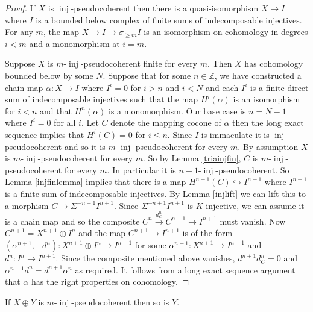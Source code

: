 \documentclass[12pt,oneside]{amsart}
\DeclareMathOperator{\inj}{inj}
\begin{document}
\begin{proof}
If $X$ is $\inj$-pseudocoherent then there is a quasi-isomorphism $X \to I$ where $I$ is a bounded below complex of finite sums of indecomposable injectives. For any $m$, the map $X \to I \to \sigma_{\geq m}I$ is an isomorphism on cohomology in degrees $i < m$ and a monomorphism at $i =m$. 

Suppose $X$ is $m$-$\inj$-pseudocoherent finite for every $m$. Then $X$ has cohomology bounded below by some $N$. Suppose that for some $n \in \mathbb{Z}$, we have constructed a chain map $\alpha: X \to I$ where $I^i = 0$ for $i > n$ and $i < N$ and each $I^i$ is a finite direct sum of indecomposable injectives such that the map $H^i(\alpha)$ is an isomorphism for $i < n$ and that $H^n(\alpha)$ is a monomorphism. Our base case is $n = N-1$ where $I^i = 0$ for all $i$. Let $C$ denote the mapping cocone of $\alpha$ then the long exact sequence implies that $H^i(C) = 0$ for $i \leq n$. Since $I$ is immaculate it is $\inj$-pseudocoherent and so it is $m$-$\inj$-pseudocoherent for every $m$. By assumption $X$ is $m$-$\inj$-pseudocoherent for every $m$. So by Lemma \ref{triainjfin},  $C$ is $m$-$\inj$-pseudocoherent for every $m$. In particular it is $n+1$-$\inj$-pseudocoherent. So Lemma \ref{injfinlemma} implies that there is a map $H^{n+1}(C) \hookrightarrow I^{n+1}$ where $I^{n+1}$ is a finite sum of indecomposable injectives. By Lemma \ref{injlift} we can lift this to a morphism $C \to \Sigma^{-{n+1}}I^{n+1}$. Since $\Sigma^{-{n+1}}I^{n+1}$ is $K$-injective, we can assume it is a chain map and so the composite $C^n \xrightarrow{d^n_C} C^{n+1} \to I^{n+1}$ must vanish. Now $C^{n+1} = X^{n+1} \oplus I^n$ and the map $C^{n+1} \to I^{n+1}$ is of the form $(\alpha^{n+1},-d^n): X^{n+1} \oplus I^n \to I^{n+1}$ for some $\alpha^{n+1}: X^{n+1} \to I^{n+1}$ and $d^n: I^n \to I^{n+1}$. Since the composite mentioned above vanishes, $d^{n+1}d^n_C = 0$ and $\alpha^{n+1} d^n = d^{n+1} \alpha^n$ as required. It follows from a long exact sequence argument that $\alpha$ has the right properties on cohomology. 
\end{proof}

\begin{lemma} \label{summand}
If $X \oplus Y$ is $m$-$\inj$-pseudocoherent then so is $Y$.
\end{lemma}
\end{document}
